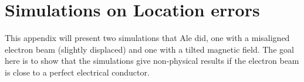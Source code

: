 \chapter{Simulations on Location errors}
\label{sec:alesresults}
This appendix will present two simulations that Ale did, one with a misaligned electron beam (slightly displaced) and one with a tilted magnetic field.
The goal here is to show that the simulations give non-physical results if the electron beam is close to a perfect electrical conductor.